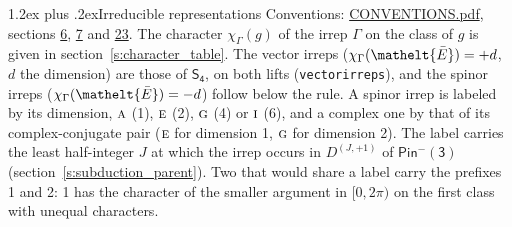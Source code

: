 \documentclass[10pt,a4paper]{article}
\makeatletter
\renewcommand\section{\@startsection{section}{1}{\z@}{-3ex plus -1ex minus -.2ex}%
  {1.2ex plus .2ex}{\normalfont\large\sffamily\bfseries\color{parttitle}}}
\numberwithin{equation}{section}
\newcommand{\eltfont}[1]{{\let\sigma\eltsigma\mathelt{#1}}}
\newcommand{\grp}[1]{\mathsf{#1}}
\newcommand{\irr}[1]{\text{\normalfont\scshape #1}}
\newcommand{\elt}[1]{\eltfont{#1}}
\newcommand{\irrJp}[2]{D^{(#1,#2)}}
\newcommand{\irchar}[1]{\chi_{#1}}
\newcommand{\barred}[1]{\bar{#1}}
\makeatother
\begin{document}
\section{Irreducible representations}\label{s:irreps}
Conventions: \href{../../CONVENTIONS.pdf}{CONVENTIONS.pdf}, sections \href{../../../rotation/CONVENTIONS.pdf\#conv.6}{6}, \href{../../../rotation/CONVENTIONS.pdf\#conv.7}{7} and \href{../../CONVENTIONS.pdf\#conv.23}{23}.
\leavevmode\label{n:function.character}\label{n:irrep.Gamma}The character $\irchar{\Gamma}(g)$ of the irrep $\Gamma$ on the class of $g$ is given in section~\ref{s:character_table}. \label{n:index.dimension}The vector irreps ($\irchar{\Gamma}(\elt{\barred{E}}) = +d$, $d$ the dimension) are those of \href{../../../rotation/data/pdf/S4.pdf}{$\grp{S_{4}}$}, on both lifts (\texttt{vectorirreps}), and the spinor irreps ($\irchar{\Gamma}(\elt{\barred{E}}) = -d$) follow below the rule. A spinor irrep is labeled by its dimension, $\irr{a}$ (1), $\irr{e}$ (2), $\irr{g}$ (4) or $\irr{i}$ (6), and a complex one by that of its complex-conjugate pair ($\irr{e}$ for dimension 1, $\irr{g}$ for dimension 2). The label carries the least half-integer $J$ at which the irrep occurs in $\irrJp{J}{+1}$ of $\grp{Pin^{-}(3)}$ (section~\ref{s:subduction_parent}). Two that would share a label carry the prefixes 1 and 2: 1 has the character of the smaller argument in $[0, 2\pi)$ on the first class with unequal characters.
\end{document}
